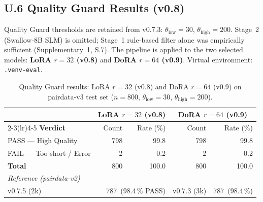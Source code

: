 \documentclass[onecolumn]{article}
\begin{document}
\subsection*{U.6 Quality Guard Results (v0.8)}
\label{sec:u6_quality_guard}

Quality Guard thresholds are retained from v0.7.3:
$\theta_{\mathrm{low}}=30$, $\theta_{\mathrm{high}}=200$.
Stage~2 (Swallow-8B SLM) is omitted; Stage~1 rule-based filter
alone was empirically sufficient (Supplementary~1, S.7).
The pipeline is applied to the two selected models:
\textbf{LoRA $r{=}32$ (v0.8)} and \textbf{DoRA $r{=}64$ (v0.9)}.
Virtual environment: \texttt{.venv-eval}.

\begin{table}[h]
\centering
\caption{Quality Guard results: LoRA $r{=}32$ (v0.8) and DoRA $r{=}64$ (v0.9)
         on pairdata-v3 test set ($n=800$, $\theta_{\mathrm{low}}=30$,
         $\theta_{\mathrm{high}}=200$).}
\label{tab:u6_qg_results}
\setlength{\tabcolsep}{4pt}
\small
\begin{tabular}{lrrrr}
\toprule
 & \multicolumn{2}{c}{LoRA $r{=}32$ (v0.8)} & \multicolumn{2}{c}{DoRA $r{=}64$ (v0.9)} \\
\cmidrule(lr){2-3}\cmidrule(lr){4-5}
\textbf{Verdict} & Count & Rate (\%) & Count & Rate (\%) \\
\midrule
PASS --- High Quality            & 798 & 99.8 & 798 & 99.8 \\
FAIL --- Too short / Error       &   2 &  0.2 &   2 &  0.2 \\
\midrule
\textbf{Total}                   & 800 & 100.0 & 800 & 100.0 \\
\midrule
\multicolumn{5}{l}{\textit{Reference (pairdata-v2)}} \\
v0.7.5 (2k) & \multicolumn{2}{r}{787\ (98.4\,\% PASS)} &
v0.7.3 (3k) & \multicolumn{1}{r}{787\ (98.4\,\%)} \\
\bottomrule
\end{tabular}
\end{table}
\end{document}
